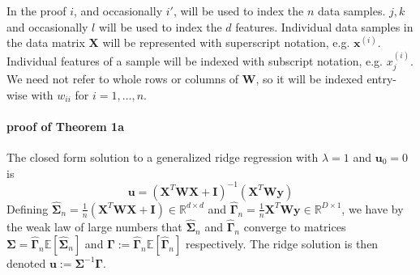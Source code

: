 \documentclass[mnsc,blindrev]{informs3}
\begin{document}
        In the proof $i$, and occasionally $i'$, will be used to index the $n$ data samples. $j,k$ and occasionally $l$ will be used to index the $d$ features. Individual data samples in the data matrix $\mathbf{X}$ will be represented with superscript notation, e.g. $\mathbf{x}^{(i)}$. Individual features of a sample will be indexed with subscript notation, e.g. $x^{(i)}_j$. We need not refer to whole rows or columns of $\mathbf{W}$, so it will be indexed entry-wise with $w_{ii}$ for $i=1,\ldots,n$.
    
    
        \paragraph{proof of Theorem 1a}
            The closed form solution to a generalized ridge regression with $\lambda = 1$ and $\mathbf{u}_0 = 0$ is
            \begin{equation*}
                \mathbf{u} = (\mathbf{X}^T \mathbf{W} \mathbf{X} + \mathbf{I})^{-1}(\mathbf{X}^T\mathbf{W}\mathbf{y})%
            \end{equation*}
                Defining $\hat{\mathbf{\Sigma}}_n = \frac{1}{n}(\mathbf{X}^T \mathbf{W} \mathbf{X} +  \mathbf{I}) \in \mathbb{R}^{d\times d}$ and $\hat{\mathbf{\Gamma}}_n = \frac{1}{n}\mathbf{X}^T \mathbf{W}\mathbf{y}\in \mathbb{R}^{D \times 1}$, we have by the weak law of large numbers that $\hat{\mathbf{\Sigma}}_n$ and  $\hat{\mathbf{\Gamma}}_n$ converge to matrices $\mathbf{\Sigma}=\hat{\mathbf{\Gamma}}_n \mathds{E}[\hat{\mathbf{\Sigma}}_n]$ and $\mathbf{\Gamma}:=\hat{\mathbf{\Gamma}}_n \mathds{E}[\hat{\mathbf{\Gamma}}_n]$ respectively.
                The ridge solution is then denoted $\mathbf{u} := \mathbf{\Sigma}^{-1}\mathbf{\Gamma}$. 
                
\end{document}
